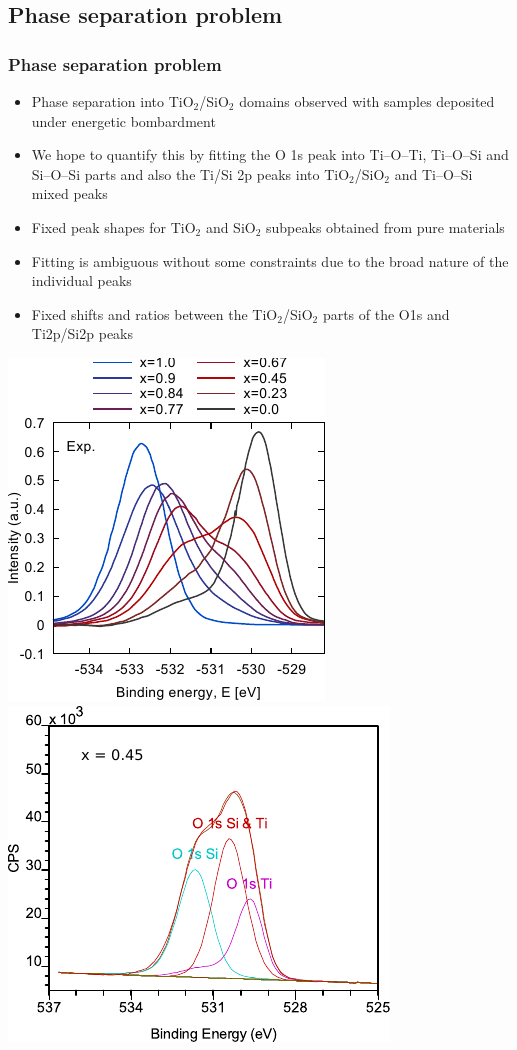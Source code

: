 \documentclass[noamsthm,8pt,t,xcolor={dvipsnames}]{beamer}
\begin{document}
\subsection{Phase separation problem}

\begin{frame}
   \frametitle{Phase separation problem}
   \vspace{-0.3cm}
   \begin{itemize}
      \item Phase separation into TiO$_2$/SiO$_2$ domains observed with samples deposited under energetic bombardment
      \item We hope to quantify this by fitting the O 1s peak into Ti--O--Ti, Ti--O--Si and Si--O--Si parts and also the Ti/Si 2p peaks into TiO$_2$/SiO$_2$ and Ti--O--Si mixed peaks
      \item Fixed peak shapes for TiO$_2$ and SiO$_2$ subpeaks obtained from pure materials
      \item Fitting is ambiguous without some constraints due to the broad nature of the individual peaks
      \item Fixed shifts and ratios between the TiO$_2$/SiO$_2$ parts of the O1s and Ti2p/Si2p peaks
   \end{itemize}
   \begin{center}
      \includegraphics[width=0.35\linewidth]{figures/XPSexp.pdf}
      \hspace{0.2cm}\vspace{-1cm}   
      \includegraphics[width=0.37\linewidth]{figures/XPSfit.pdf}
   \end{center}

\end{frame}
\end{document}
